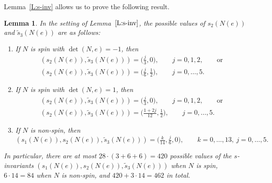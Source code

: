 \documentclass[pdftex]{sigma}
\numberwithin{equation}{section}
\newtheorem{Lemma}[Theorem]{Lemma}
\theoremstyle{definition}
\numberwithin{table}{section}
\begin{document}
Lemma~\ref{L:s-inv} allows us to prove the following result.
\begin{Lemma}\label{L:s_inv_nec}
	In the setting of Lemma~$\ref{L:s-inv}$, the possible values of $s_2(N(e))$ and $\tilde{s}_3(N(e))$ are as follows:
	\begin{enumerate}\itemsep=0pt
		\item If $N$ is spin with $\det(N,e)=-1$, then
		\begin{gather*}
         (s_2(N(e)),\tilde{s}_3(N(e)))=\bigl(\tfrac{j}{3},0\bigr),\qquad j=0,1,2,\qquad \text{or}\\
          (s_2(N(e)),\tilde{s}_3(N(e)))=\bigl(\tfrac{j}{6},\tfrac{1}{2}\bigr),\qquad j=0,\dots,5.
        \end{gather*}
		\item If $N$ is spin with $\det(N,e)=1$, then
		\begin{gather*}
         (s_2(N(e)),\tilde{s}_3(N(e)))=\bigl(\tfrac{j}{3},0\bigr), \qquad j=0,1,2,\qquad \text{or}\\
          (s_2(N(e)),\tilde{s}_3(N(e)))=\bigl(\tfrac{1+2j}{12},\tfrac{1}{2}\bigr),\qquad j=0,\dots,5.
         \end{gather*}
		\item If $N$ is non-spin, then
		\[(s_1(N(e)),s_2(N(e)),\tilde{s}_3(N(e)))=\bigl(\tfrac{k}{14},\tfrac{j}{6},0\bigr),\qquad k=0,\dots,13,\  j=0,\dots,5.\]
	\end{enumerate}
	In particular, there are at most $28\cdot (3+6+6)=420$ possible values of the $s$-invariants $(s_1(N(e)),s_2(N(e)),\tilde{s}_3(N(e)))$ when $N$ is spin, $6\cdot 14=84$ when $N$ is non-spin, and $420+3\cdot 14=462$ in total.
\end{Lemma}
\end{document}
